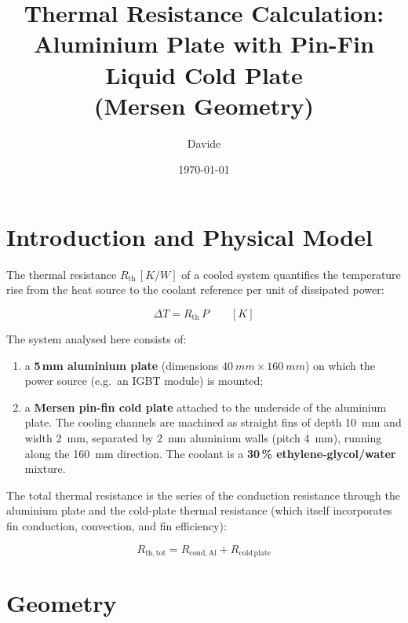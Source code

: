 \documentclass[a4paper,11pt]{article}
\title{\textbf{Thermal Resistance Calculation:\\
Aluminium Plate with Pin-Fin Liquid Cold Plate\\
(Mersen Geometry)}}
\author{Davide}
\date{\today}
\begin{document}
\maketitle
\tableofcontents
\bigskip

\section{Introduction and Physical Model}

The thermal resistance $R_{\mathrm{th}}\,[\si{K/W}]$ of a cooled system quantifies
the temperature rise from the heat source to the coolant reference per unit of
dissipated power:

\begin{equation}
  \Delta T = R_{\mathrm{th}}\, P
  \qquad\left[\si{K}\right]
\end{equation}

The system analysed here consists of:
\begin{enumerate}
  \item a \textbf{5\,mm aluminium plate} (dimensions $\SI{40}{mm}\times\SI{160}{mm}$)
        on which the power source (e.g.\ an IGBT module) is mounted;
  \item a \textbf{Mersen pin-fin cold plate} attached to the underside of the
        aluminium plate. The cooling channels are machined as straight fins of
        depth \SI{10}{mm} and width \SI{2}{mm}, separated by \SI{2}{mm} aluminium
        walls (pitch \SI{4}{mm}), running along the \SI{160}{mm} direction.
        The coolant is a \textbf{30\,\% ethylene-glycol/water} mixture.
\end{enumerate}

The total thermal resistance is the series of the conduction resistance through the
aluminium plate and the cold-plate thermal resistance (which itself incorporates fin
conduction, convection, and fin efficiency):

\begin{equation}
  \boxed{R_{\mathrm{th,tot}} = R_{\mathrm{cond,Al}} + R_{\mathrm{cold\,plate}}}
\end{equation}

\section{Geometry}
\end{document}
